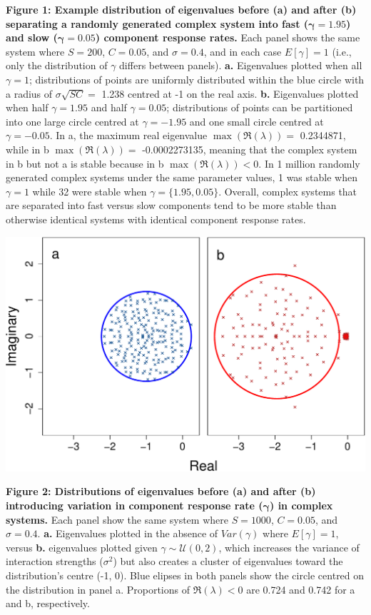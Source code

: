 \documentclass[]{article}
\begin{document}
\textbf{Figure 1: Example distribution of eigenvalues before (a) and
after (b) separating a randomly generated complex system into fast
(\(\boldsymbol{\gamma} = 1.95\)) and slow
(\(\boldsymbol{\gamma} = 0.05\)) component response rates.} Each panel
shows the same system where \(S = 200\), \(C = 0.05\), and
\(\sigma = 0.4\), and in each case \(E[\gamma] = 1\) (i.e., only the
distribution of \(\gamma\) differs between panels). \textbf{a.}
Eigenvalues plotted when all \(\gamma = 1\); distributions of points are
uniformly distributed within the blue circle with a radius of
\(\sigma\sqrt{SC} =\) 1.238 centred at -1 on the real axis. \textbf{b.}
Eigenvalues plotted when half \(\gamma = 1.95\) and half
\(\gamma = 0.05\); distributions of points can be partitioned into one
large circle centred at \(\gamma = -1.95\) and one small circle centred
at \(\gamma = -0.05\). In a, the maximum real eigenvalue
\(\max\left(\Re(\lambda)\right) =\) 0.2344871, while in b
\(\max\left(\Re(\lambda)\right) =\) -0.0002273135, meaning that the
complex system in b but not a is stable because in b
\(\max\left(\Re(\lambda)\right) < 0\). In 1 million randomly generated
complex systems under the same parameter values, 1 was stable when
\(\gamma = 1\) while 32 were stable when \(\gamma = \{1.95, 0.05\}\).
Overall, complex systems that are separated into fast versus slow
components tend to be more stable than otherwise identical systems with
identical component response rates.

\includegraphics{ms_files/figure-latex/unnamed-chunk-10-1.pdf}

\clearpage

\textbf{Figure 2: Distributions of eigenvalues before (a) and after (b)
introducing variation in component response rate
(\(\boldsymbol{\gamma}\)) in complex systems.} Each panel show the same
system where \(S = 1000\), \(C = 0.05\), and \(\sigma = 0.4\).
\textbf{a.} Eigenvalues plotted in the absence of \(Var(\gamma)\) where
\(E[\gamma] = 1\), versus \textbf{b.} eigenvalues plotted given
\(\gamma \sim \mathcal{U}(0, 2)\), which increases the variance of
interaction strengths (\(\sigma^{2}\)) but also creates a cluster of
eigenvalues toward the distribution's centre (-1, 0). Blue elipses in
both panels show the circle centred on the distribution in panel a.
Proportions of \(\Re(\lambda) < 0\) are 0.724 and 0.742 for a and b,
respectively.
\end{document}
